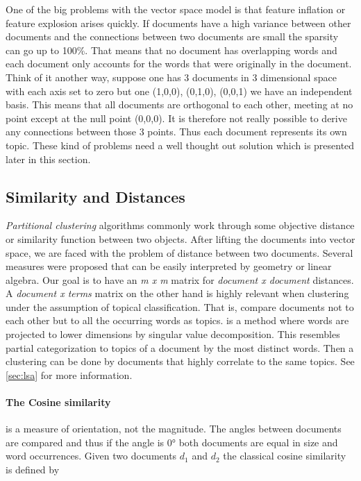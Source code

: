     One of the big problems with the vector space model is that feature inflation or feature explosion arises quickly. If documents have a high variance between other documents and the connections between two documents are small the sparsity can go up to 100\%. That means that no document has overlapping words and each document only accounts for the words that were originally in the document. Think of it another way, suppose one has 3 documents in 3 dimensional space with each axis set to zero but one (1,0,0), (0,1,0), (0,0,1) we have an independent basis. This means that all documents are orthogonal to each other, meeting at no point except at the null point (0,0,0). It is therefore not really possible to derive any connections between those 3 points. Thus each document represents its own topic.
    These kind of problems need a well thought out solution which is presented later in this section.

  \subsection{Similarity and Distances}
  \label{sec:similarity}

    \emph{Partitional clustering} algorithms commonly work through some objective distance or similarity function between two objects. After lifting the documents into vector space, we are faced with the problem of distance between two documents. Several measures were proposed that can be easily interpreted by geometry or linear algebra. Our goal is to have an \emph{m x m} matrix for \emph{document x document} distances. A \emph{document x terms} matrix on the other hand is highly relevant when clustering under the assumption of topical classification. That is, compare documents not to each other but to all the occurring words as topics. \lsafull{} is a method where words are projected to lower dimensions by singular value decomposition. This resembles partial categorization to topics of a document by the most distinct words. Then a clustering can be done by documents that highly correlate to the same topics. See \ref{sec:lsa} for more information.

    \paragraph{The Cosine similarity} is a measure of orientation, not the magnitude. The angles between documents are compared and thus if the angle is $0°$ both documents are equal in size and word occurrences. Given two documents $d_1$ and $d_2$ the classical cosine similarity is defined by

